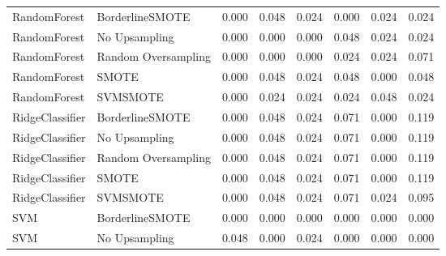 \begin{tabular}{llllllll}
                RandomForest &     BorderlineSMOTE & 0.000 &                     0.048 &                 0.024 &                  0.000 &                                   0.024 &     0.024 \\
                RandomForest &       No Upsampling & 0.000 &                     0.000 &                 0.000 &                  0.048 &                                   0.024 &     0.024 \\
                RandomForest & Random Oversampling & 0.000 &                     0.000 &                 0.000 &                  0.024 &                                   0.024 &     0.071 \\
                RandomForest &               SMOTE & 0.000 &                     0.048 &                 0.024 &                  0.048 &                                   0.000 &     0.048 \\
                RandomForest &            SVMSMOTE & 0.000 &                     0.024 &                 0.024 &                  0.024 &                                   0.048 &     0.024 \\
             RidgeClassifier &     BorderlineSMOTE & 0.000 &                     0.048 &                 0.024 &                  0.071 &                                   0.000 &     0.119 \\
             RidgeClassifier &       No Upsampling & 0.000 &                     0.048 &                 0.024 &                  0.071 &                                   0.000 &     0.119 \\
             RidgeClassifier & Random Oversampling & 0.000 &                     0.048 &                 0.024 &                  0.071 &                                   0.000 &     0.119 \\
             RidgeClassifier &               SMOTE & 0.000 &                     0.048 &                 0.024 &                  0.071 &                                   0.000 &     0.119 \\
             RidgeClassifier &            SVMSMOTE & 0.000 &                     0.048 &                 0.024 &                  0.071 &                                   0.024 &     0.095 \\
                         SVM &     BorderlineSMOTE & 0.000 &                     0.000 &                 0.000 &                  0.000 &                                   0.000 &     0.000 \\
                         SVM &       No Upsampling & 0.048 &                     0.000 &                 0.024 &                  0.000 &                                   0.000 &     0.000 \\

\end{tabular}

